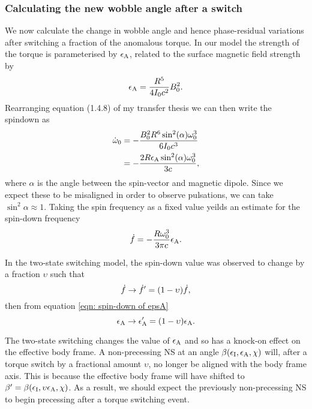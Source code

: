\documentclass[../full_thesis/full_thesis.tex]{subfiles}
\begin{document}
\subsubsection{Calculating the new wobble angle after a switch}
We now calculate the change in wobble angle and hence phase-residual variations
after switching a fraction of the anomalous torque.
In our model the strength of the torque is parameterised
by $\epsilon_{\mathrm{A}}$, related to the surface magnetic field strength by 
\begin{align}
    \epsilon_{\mathrm{A}} = \frac{R^{5}}{4I_{0} c^{2}} B_{0}^{2}.
\end{align}
Rearranging equation (1.4.8) of my transfer thesis we can then write the 
spindown as 
\begin{align}
    \dot{\omega}_{0} & = -\frac{B_{0}^{2}R^{6} \sin^{2}(\alpha) \omega_{0}^{3}}{6 I_{0} c^{3}} \\
    & = - \frac{2 R \epsilon_{\mathrm{A}} \sin^{2}(\alpha) \omega_{0}^{3}}{3 c},
\end{align}
where $\alpha$ is the angle between the spin-vector and magnetic dipole. Since
we expect these to be misaligned in order to observe pulsations, we can take
$\sin^{2}\alpha \approx 1$.
Taking the spin frequency as a fixed value yeilds an estimate for the
spin-down frequency
\begin{equation}
    \dot{f} = - \frac{R\omega_{0}^{3}}{3\pi c}\epsilon_{\mathrm{A}}.
    \label{eqn: spin-down of epsA}
\end{equation}

In the two-state switching model, the spin-down value was observed to change
by a fraction $\upsilon$ such that
\begin{equation}
    \dot{f} \rightarrow \dot{f}' = (1-\upsilon)\dot{f},
\end{equation}
then from equation \eqref{eqn: spin-down of epsA} 
\begin{equation}
    \epsilon_{\mathrm{A}} \rightarrow \epsilon_{\mathrm{A}}' = (1-\upsilon)\epsilon_{\mathrm{A}}.
\end{equation}

The two-state switching changes the value of $\epsilon_{\mathrm{A}}$ and so has a knock-on 
effect on the effective body frame. A non-precessing NS at an
angle $\beta(\epsilon_{\mathrm{I}}, \epsilon_{\mathrm{A}}, \chi)$ will, after a torque switch by a fractional
amount $\upsilon$, no longer be aligned with the body frame axis. This is 
because the effective body frame will have shifted to 
$\beta' = \beta(\epsilon_{\mathrm{I}}, \upsilon\epsilon_{\mathrm{A}}, \chi)$. As a result, we should expect the
previously non-precessing NS to begin precessing after a torque switching event. 
\end{document}
